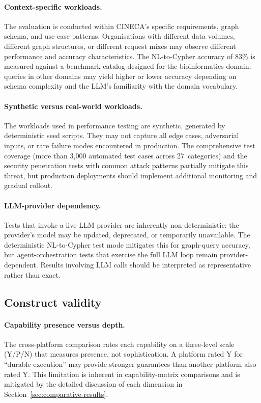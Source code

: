 \documentclass[a4paper]{sapthesis}
\begin{document}
\paragraph{Context-specific workloads.}
The evaluation is conducted within CINECA's specific requirements, graph
schema, and use-case patterns.  Organisations with different data
volumes, different graph structures, or different request mixes may
observe different performance and accuracy characteristics.  The NL-to-Cypher
accuracy of 83\% is measured against a benchmark catalog designed for
the bioinformatics domain; queries in other domains may yield higher or
lower accuracy depending on schema complexity and the LLM's familiarity
with the domain vocabulary.

\paragraph{Synthetic versus real-world workloads.}
The workloads used in performance testing are synthetic, generated by
deterministic seed scripts.  They may not capture all edge cases,
adversarial inputs, or rare failure modes encountered in production.
The comprehensive test coverage (more than 3{,}000 automated test cases
across 27~categories) and the security penetration tests with common
attack patterns partially mitigate this threat, but production
deployments should implement additional monitoring and gradual rollout.

\paragraph{LLM-provider dependency.}
Tests that invoke a live LLM provider are inherently non-deterministic:
the provider's model may be updated, deprecated, or temporarily
unavailable.  The deterministic NL-to-Cypher test mode mitigates this
for graph-query accuracy, but agent-orchestration tests that exercise
the full LLM loop remain provider-dependent.  Results involving LLM
calls should be interpreted as representative rather than exact.

\subsection{Construct validity}

\paragraph{Capability presence versus depth.}
The cross-platform comparison rates each capability on a three-level
scale (Y/P/N) that measures presence, not sophistication.  A platform
rated Y for ``durable execution'' may provide stronger guarantees than
another platform also rated Y.  This limitation is inherent in
capability-matrix comparisons and is mitigated by the detailed
discussion of each dimension in Section~\ref{sec:comparative-results}.
\end{document}

